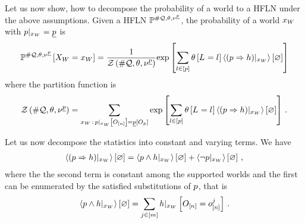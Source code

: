 Let us now show, how to decompose the probability of a \firstOrderLogic{} world to a HFLN under the above assumptions.
Given a HFLN $\mathbb{P}^{\#\mathcal{Q},\theta,\nu^{\underline{p}}}$, the probability of a world $x_{W}$ with ${p}|_{x_{W}}=\underline{p}$ is %
\begin{align*}
    \mathbb{P}^{\#\mathcal{Q},\theta,\nu^{\underline{p}}}\left[X_{W}=x_{W}\right]
    = \frac{1}{\mathcal{Z}\left(\#\mathcal{Q},\theta,\nu^{\underline{p}}\right)}
    \mathrm{exp}\left[\sum_{l\in[p]}\theta\left[L_{}=l_{}\right]\left\langle {(p\Rightarrow h)}|_{x_{W}}\right\rangle \left[ \varnothing \right]\right]
\end{align*}
where the partition function is
\begin{align*}
    \mathcal{Z}\left(\#\mathcal{Q},\theta,\nu^{\underline{p}}\right) =
    \sum_{x_{W} \,:\, {p}|_{x_{W}} \left[O_{[n]}\right] = \underline{p}\left[O_{p}\right]}
    \mathrm{exp}\left[\sum_{l\in[p]}\theta\left[L_{}=l_{}\right]\left\langle {(p\Rightarrow h)}|_{x_{W}}\right\rangle \left[ \varnothing \right]\right] \, .
\end{align*}


Let us now decompose the statistics into constant and varying terms.
We have
\begin{align*}
    \left\langle {(p\Rightarrow h)}|_{x_{W}}\right\rangle \left[ \varnothing \right] =
    \left\langle {p\land h}|_{x_{W}}\right\rangle \left[ \varnothing \right] + \left\langle {\lnot p}|_{x_{W}}\right\rangle \left[ \varnothing \right] \, ,
\end{align*}
where the the second term is constant among the supported worlds and the first can be enumerated by the satisfied substitutions of $p$, that is
\begin{align*}
    \left\langle {p\land h}|_{x_{W}}\right\rangle \left[ \varnothing \right]
    = \sum_{j\in[m]}{h}|_{x_{W}} \left[O_{[n]} = o_{[n]}^{j}\right] \, .
\end{align*}


